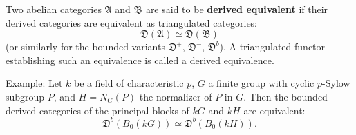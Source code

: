 Two abelian categories $\mathfrak{A}$ and $\mathfrak{B}$ are said to be \textbf{derived equivalent} if their derived categories are equivalent as triangulated categories:
$$
\mathfrak{D}(\mathfrak{A}) \simeq \mathfrak{D}(\mathfrak{B})
$$
(or similarly for the bounded variants $\mathfrak{D}^{+}$, $\mathfrak{D}^{-}$, $\mathfrak{D}^{b}$). A triangulated functor establishing such an equivalence is called a derived equivalence.

Example: Let $k$ be a field of characteristic $p$, $G$ a finite group with cyclic $p$-Sylow subgroup $P$, and $H = N_G(P)$ the normalizer of $P$ in $G$. Then the bounded derived categories of the principal blocks of $kG$ and $kH$ are equivalent:
$$
\mathfrak{D}^{b}(B_0(kG)) \simeq \mathfrak{D}^{b}(B_0(kH)).
$$
